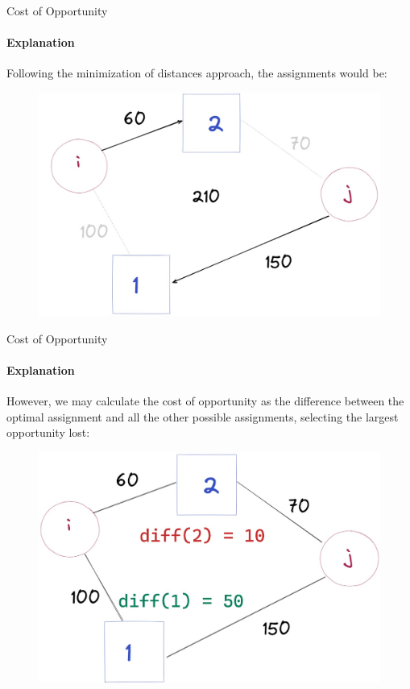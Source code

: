 \documentclass{beamer}
\begin{document}
\begin{frame}{Cost of Opportunity}
    \framesubtitle{Explanation}
    Following the minimization of distances approach, the assignments would be:
    \begin{figure}
        \centering
        \includegraphics[scale=0.25]{Screenshot_1}
    \end{figure}
\end{frame}
\begin{frame}{Cost of Opportunity}
    \framesubtitle{Explanation}
    However, we may calculate the cost of opportunity as the difference between the optimal assignment and all the other possible assignments, selecting the largest opportunity lost:
    \begin{figure}
        \centering
        \includegraphics[scale=0.25]{Screenshot_2}
    \end{figure}
\end{frame}
\end{document}
